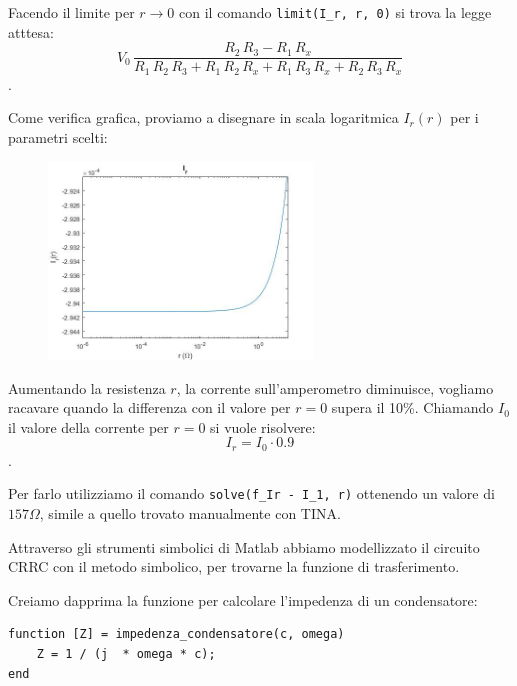 Facendo il limite per $r \rightarrow 0$ con il comando \verb|limit(I_r, r, 0)| si trova la legge atttesa:
\begin{equation*}
    V_{0}\,\frac{R_{2}\,R_{3}-R_{1}\,R_{x}}{R_{1}\,R_{2}\,R_{3}+R_{1}\,R_{2}\,R_{x}+R_{1}\,R_{3}\,R_{x}+R_{2}\,R_{3}\,R_{x}}
\end{equation*}.

Come verifica grafica, proviamo a disegnare in scala logaritmica $I_r(r)$ per i parametri scelti:
\begin{figure}[H]
\caption{}
    \includegraphics[width=7cm]{settimana_2/immagini/I_r.jpg}
    \centering
\end{figure}

Aumentando la resistenza $r$, la corrente sull'amperometro diminuisce, vogliamo racavare quando la differenza con il valore per $r = 0$ supera il 10\%. Chiamando $I_0$ il valore della corrente per $r = 0$ si vuole risolvere:
\begin{equation*}
    I_r = I_0 \cdot 0.9
\end{equation*}.

Per farlo utilizziamo il comando \verb|solve(f_Ir - I_1, r)| ottenendo un valore di $157 \Omega$, simile a quello trovato manualmente con TINA.





Attraverso gli strumenti simbolici di Matlab abbiamo modellizzato il circuito CRRC con il metodo simbolico, per trovarne la funzione di trasferimento.

Creiamo dapprima la funzione per calcolare l'impedenza di un condensatore:
\begin{lstlisting}[frame=single]
function [Z] = impedenza_condensatore(c, omega)
    Z = 1 / (j  * omega * c);
end
\end{lstlisting}

